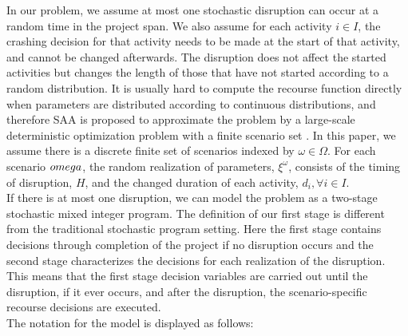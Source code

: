 \documentclass[11pt]{article}
\begin{document}
	\newline
	In our problem, we assume at most one stochastic disruption can occur at a random time in the project span. We also assume for each activity \(i \in I\), the crashing decision for that activity needs to be made at the start of that activity, and cannot be changed afterwards. The disruption does not affect the started activities but changes the length of those that have not started according to a random distribution. It is usually hard to compute the recourse function directly when parameters are distributed according to continuous distributions, and therefore SAA is proposed to approximate the problem by a large-scale deterministic optimization problem with a finite scenario set \cite{kim2015guide,shapiro2009lectures}. In this paper, we assume there is a discrete finite set of scenarios indexed by \(\omega \in \Omega\). For each scenario \(\\omega\), the random realization of parameters, \(\xi^\omega\), consists of the timing of disruption, \(H\), and the changed duration of each activity, \(d_i, \forall i \in I\). \\
	\newline
	If there is at most one disruption, we can model the problem as a two-stage stochastic mixed integer program. The definition of our first stage is different from the traditional stochastic program setting. Here the first stage contains decisions through completion of the project if no disruption occurs and the second stage characterizes the decisions for each realization of the disruption. This means that the first stage decision variables are carried out until the disruption, if it ever occurs, and after the disruption, the scenario-specific recourse decisions are executed.\\
	\newline
	The notation for the model is displayed as follows:
\end{document}
